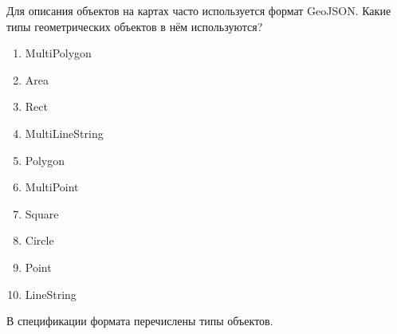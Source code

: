 
Для описания объектов на картах часто используется формат GeoJSON. Какие типы геометрических объектов в нём используются?


\begin{enumerate}
    \item MultiPolygon
    \item Area
    \item Rect
    \item MultiLineString
    \item Polygon
    \item MultiPoint
    \item Square
    \item Circle
    \item Point
    \item LineString
\end{enumerate}

\explanationSection

В спецификации формата перечислены типы объектов.

